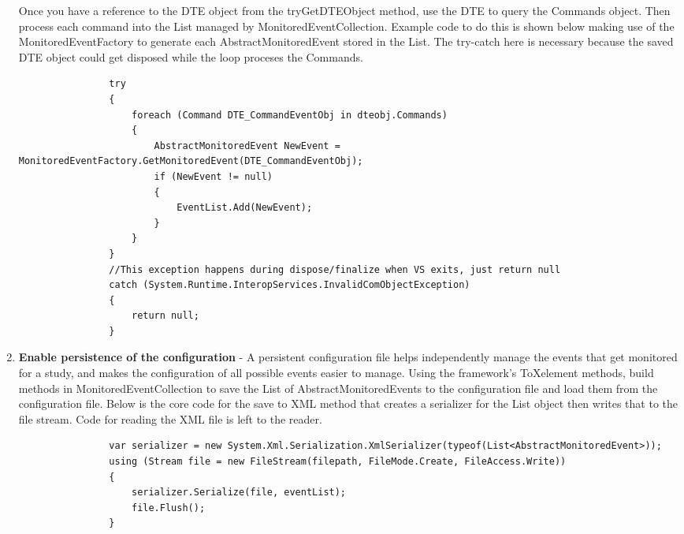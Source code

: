 \begin{enumerate}
\begin{lstlisting}
\end{lstlisting}

Once you have a reference to the DTE object from the tryGetDTEObject method, use the DTE to query the Commands  object.  Then process each command into the List managed by MonitoredEventCollection.  Example code to do this is shown below making use of the MonitoredEventFactory to generate each AbstractMonitoredEvent stored in the List.  The try-catch here is necessary because the saved DTE object could get disposed while the loop proceses the Commands.

\begin{lstlisting}
                try
                {
                    foreach (Command DTE_CommandEventObj in dteobj.Commands)
                    {
                        AbstractMonitoredEvent NewEvent = MonitoredEventFactory.GetMonitoredEvent(DTE_CommandEventObj);
                        if (NewEvent != null)
                        {
                            EventList.Add(NewEvent);
                        }
                    }
                }
                //This exception happens during dispose/finalize when VS exits, just return null
                catch (System.Runtime.InteropServices.InvalidComObjectException)
                {
                    return null;
                }
\end{lstlisting}

\item {\bf Enable persistence of the configuration} -
A persistent configuration file helps independently manage the events that get monitored for a study, and makes the configuration of all possible events easier to manage.    Using the framework's ToXelement methods, build methods in MonitoredEventCollection to save the List of AbstractMonitoredEvents to the configuration file and load them from the configuration file.  Below is the core code for the save to XML method that creates a serializer for the List object then writes that to the file stream.  Code for reading the XML file is left to the reader.

\begin{lstlisting}
                var serializer = new System.Xml.Serialization.XmlSerializer(typeof(List<AbstractMonitoredEvent>));
                using (Stream file = new FileStream(filepath, FileMode.Create, FileAccess.Write))
                {
                    serializer.Serialize(file, eventList);
                    file.Flush();
                }
\end{lstlisting}

\end{enumerate}


